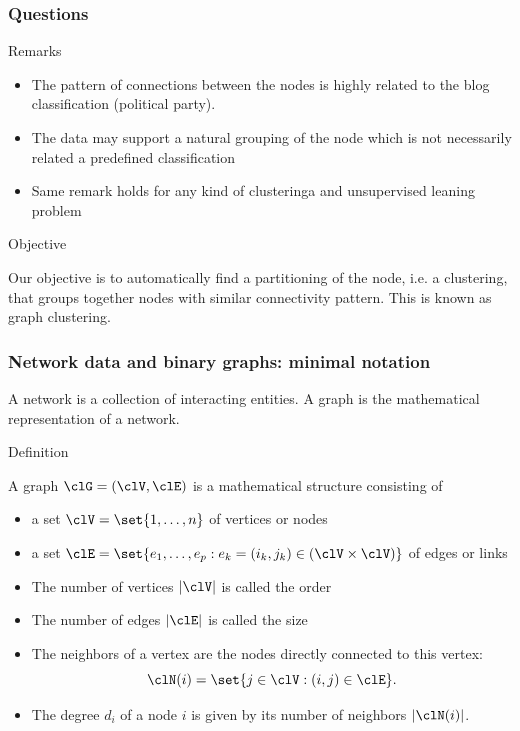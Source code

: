 \documentclass{beamer}\usepackage[]{graphicx}\usepackage[]{color}
\begin{document}
\begin{frame}
  \frametitle{Questions}

\begin{block}{Remarks}  
  
  \begin{itemize}
  
  \item  The pattern of connections between the nodes is highly related to the blog classification (political party). 
  
  \item The data may support a natural grouping of the node which is not necessarily related a predefined classification
  
  \item Same remark holds for any kind of clusteringa and unsupervised leaning problem

  \end{itemize}
\end{block}

  \vfill
  
\begin{block}{Objective}  

  Our objective is to automatically find a \alert{partitioning} of the node, i.e. a clustering, that groups together nodes with similar connectivity pattern. This is known as graph clustering.

\end{block}

\end{frame}

\begin{frame}
  \frametitle{Network data and binary graphs: minimal notation}

A \alert{network} is a collection of interacting entities. A \alert{graph} is the mathematical representation of a network.

\begin{block}{Definition}

A graph $\clG=(\clV,\clE)$ is a mathematical structure consisting of

  \begin{itemize}
    \item a set $\clV=\set{1,\dots,n}$ of \alert{vertices} or \alert{nodes} 
    \item a set $\clE=\set{e_1,\dots,e_p:e_k=(i_k,j_k)\in (\clV\times\clV)}$ of \alert{edges} or \alert{links} 
    \item The number of vertices $|\clV|$ is called the \alert{order}
    \item The number of edges $|\clE|$ is called the \alert{size}
    \item The neighbors of a vertex are the nodes directly connected to this vertex:
    \[
      \clN(i) = \set{j\in\clV : (i,j) \in \clE}.
    \]
    \item The degree $d_i$ of a node $i$ is given by its number of neighbors $|\clN(i)|$.
  \end{itemize}
\end{block}

\end{frame}
\end{document}
